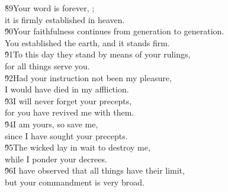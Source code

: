 \begin{poetry}
\poeml \v{89}Your word is forever, ; \\
\poemll    it is firmly established in heaven. \\
\poeml \v{90}Your faithfulness continues from generation to generation. \\
\poemll    You established the earth, and it stands firm. \\
\poeml \v{91}To this day they stand by means of your rulings, \\
\poemll    for all things serve you. \\
\poeml \v{92}Had your instruction not been my pleasure, \\
\poemll    I would have died in my affliction. \\
\poeml \v{93}I will never forget your precepts, \\
\poemll    for you have revived me with them. \\
\poeml \v{94}I am yours, so save me, \\
\poemll    since I have sought your precepts. \\
\poeml \v{95}The wicked lay in wait to destroy me, \\
\poemll    while I ponder your decrees. \\
\poeml \v{96}I have observed that all things have their limit, \\
\poemll    but your commandment is very broad.
\end{poetry}

